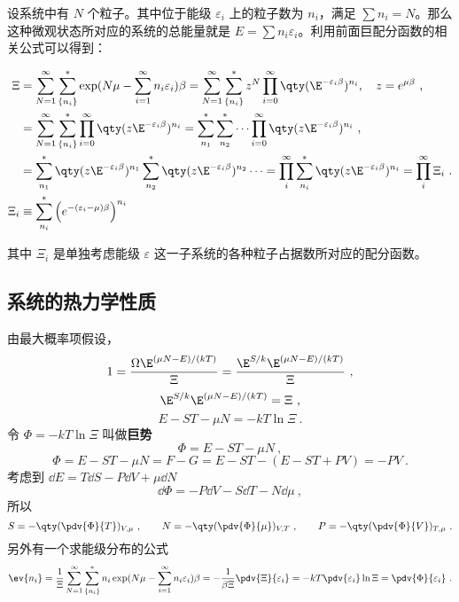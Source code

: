 设系统中有 $N$ 个粒子。其中位于能级 $\varepsilon_i$ 上的粒子数为 $n_i$，满足 $\sum n_i=N$。那么这种微观状态所对应的系统的总能量就是 $E=\sum n_i \varepsilon_i$。利用前面巨配分函数的相关公式可以得到：

\begin{equation}
\begin{aligned}
\Xi & = \sum_{N=1}^\infty  \sum_{\{n_i\}}^*  \exp(N\mu  - \sum_{i=1}^\infty n_i \varepsilon_i)\beta
= \sum_{N=1}^\infty  \sum_{\{n_i\}}^* z^N \prod_{i=0}^\infty \qty(\E^{-\varepsilon_i\beta})^{n_i}
,\quad z=e^{\mu\beta}~,
\\
&= \sum_{N=1}^\infty \sum_{\{n_i\}}^* \prod_{i=0}^\infty \qty(z \E^{-\varepsilon_i \beta})^{n_i}
= \sum_{n_1}^* \sum_{n_2}^* \dots \prod_{i=0}^\infty \qty(z \E^{-\varepsilon_i \beta})^{n_i}
~,
\\
&= \sum_{n_1}^* \qty(z \E^{-\varepsilon_i\beta})^{n_1} \sum_{n_2}^* \qty(z \E^{ -\varepsilon_i\beta})^{n_2}\dots
= \prod_i^\infty \sum_{n_i}^* \qty(z \E^{-\varepsilon_i \beta })^{n_i}=\prod_i^\infty \Xi_i~.\\
\Xi_i&\equiv \sum_{n_i}^* \left(e^{-(\varepsilon_i-\mu)\beta}\right)^{n_i}
\end{aligned}
\end{equation}

其中 $\Xi_i$ 是单独考虑能级 $\varepsilon$ 这一子系统的各种粒子占据数所对应的配分函数。
\subsection{系统的热力学性质}
由最大概率项假设，
\begin{equation}
1 = \frac{\Omega \E^{(\mu N - E)/(kT)}}{\Xi}
= \frac{\E^{S/k} \E^{(\mu N - E)/(kT)}}{\Xi}~,
\end{equation}
\begin{equation}
\E^{S/k} \E^{(\mu N - E)/(kT)} = \Xi~,
\end{equation}
\begin{equation} 
E - ST - \mu N =  - kT\ln \Xi~.
\end{equation}
令 $\Phi  =  - kT\ln \Xi $ 叫做\textbf{巨势}
\begin{equation}
\Phi  = E - ST - \mu N~,
\end{equation}
\begin{equation}
\Phi  = E - ST - \mu N = F - G = E - ST - (E - ST + PV) =  - PV~.
\end{equation}
考虑到 $\dd{E} = T\dd{S} - P\dd{V} + \mu \dd{N}$
\begin{equation}
\dd{\Phi} = -P\dd{V} - S\dd{T} - N\dd{\mu}~,
\end{equation}
所以
\begin{equation}
S = -\qty(\pdv{\Phi}{T})_{V,\mu } ~,\qquad 
N = - \qty(\pdv{\Phi}{\mu})_{V,T} ~,\qquad
P = - \qty(\pdv{\Phi}{V})_{T,\mu}~.
\end{equation}
另外有一个求能级分布的公式
\begin{equation}
\ev{n_i} = \frac{1}{\Xi} \sum_{N=1}^\infty \sum_{\{n_i\}}^* n_i \exp(N\mu - \sum_{i=1}^\infty n_i \varepsilon_i)\beta = -\frac{1}{\beta \Xi } \pdv{\Xi}{\varepsilon_i} =  - kT \pdv{\varepsilon_i} \ln \Xi  = \pdv{\Phi}{\varepsilon_i}~.
\end{equation}
